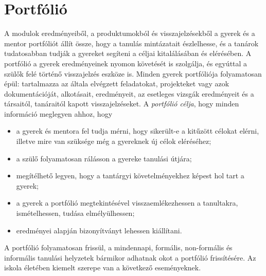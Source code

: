 \section{Portfólió}
\label{sec:portfolio}
A modulok eredményeiből, a produktumokból és visszajelzésekből a gyerek és a mentor portfóliót állít össze, hogy a tanulás mintázatait észlelhesse, és a tanárok tudatosabban tudják a gyereket segíteni a céljai kitalálásában és elérésében. A portfólió a gyerek eredményeinek nyomon követését is szolgálja, és egyúttal a szülők felé történő visszajelzés eszköze is. Minden gyerek portfóliója folyamatosan épül: tartalmazza az általa elvégzett feladatokat, projekteket vagy azok dokumentációját, alkotásait, eredményeit, az esetleges vizsgák eredményeit és a társaitól, tanáraitól kapott visszajelzéseket. A \emph{portfólió célja}, hogy minden információ meglegyen ahhoz, hogy

\begin{itemize}
      \item a gyerek és mentora fel tudja mérni, hogy sikerült-e a kitűzött célokat elérni, illetve mire van szüksége még a gyereknek új célok eléréséhez;

      \item a szülő folyamatosan rálásson a gyereke tanulási útjára;

      \item megítélhető legyen, hogy a tantárgyi követelményekhez képest hol tart a gyerek;

      \item a gyerek a portfólió megtekintésével visszaemlékezhessen a tanultakra, ismételhessen, tudása elmélyülhessen;

      \item eredményei alapján bizonyítványt lehessen kiállítani.

\end{itemize}

A portfólió folyamatosan frissül, a mindennapi, formális, non-for\-má\-lis és informális tanulási helyzetek bármikor adhatnak okot a portfólió frissítésére. Az iskola életében kiemelt szerepe van a következő eseményeknek.

